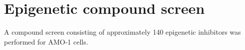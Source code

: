 \chapter{Epigenetic compound screen}

\minitoc

A compound screen consisting of approximately 140 epigenetic inhibitors was performed for AMO-1 cells. 

